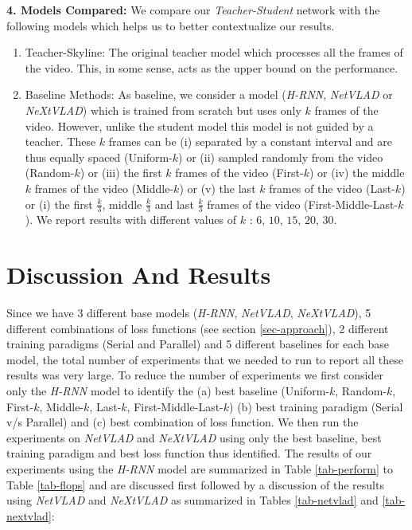 \documentclass[10pt,twocolumn,letterpaper]{article}
\newcommand{\full}{Teacher-Skyline}
\newcommand{\kstart}[1]{First-$#1$}
\newcommand{\kmid}[1]{Middle-$#1$}
\newcommand{\kend}[1]{Last-$#1$}
\newcommand{\sme}[1]{First-Middle-Last-$#1$}
\newcommand{\uni}[1]{Uniform-$#1$}
\newcommand{\rand}[1]{Random-$#1$}
\begin{document}
\noindent \textbf{4. Models Compared:} We compare our \textit{Teacher-Student} network with the following models which helps us to better contextualize our results. \begin{enumerate}[leftmargin=*,label=\alph*)]
\item \full: The original teacher model which processes all the frames of the video. This, in some sense, acts as the upper bound on the performance.
\item Baseline Methods: As baseline, we consider a model (\textit{H-RNN}, \textit{NetVLAD} or \textit{NeXtVLAD}) which is trained from scratch but uses only $k$ frames of the video. However, unlike the student model this model is not guided by a teacher. These $k$ frames can be (i) separated by a constant interval and are thus equally spaced (\uni{k}) or (ii) sampled randomly from the video (\rand{k}) or (iii) the first $k$ frames of the video (\kstart{k}) or (iv) the middle $k$ frames of the video (\kmid{k}) or (v) the last $k$ frames of the video (\kend{k}) or (i) the first $\frac{k}{3}$, middle $\frac{k}{3}$ and last $\frac{k}{3}$ frames of the video (\sme{k}). We report results with different values of $k$ : $6$, $10$, $15$, $20$, $30$.
\end{enumerate}


\section{Discussion And Results} 
Since we have 3 different base models (\textit{H-RNN}, \textit{NetVLAD}, \textit{NeXtVLAD}), 5 different combinations of loss functions (see section \ref{sec-approach}), 2 different training paradigms (Serial and Parallel) and 5 different baselines for each base model, the total number of experiments that we needed to run to report all these results was very large. To reduce the number of experiments we first consider only the \textit{H-RNN} model to identify the (a) best baseline (\uni{k}, \rand{k}, \kstart{k}, \kmid{k}, \kend{k}, \sme{k})  (b) best training paradigm (Serial v/s Parallel) and (c) best combination of loss function. We then run the experiments on \textit{NetVLAD} and \textit{NeXtVLAD} using only the best baseline, best training paradigm and best loss function thus identified. The results of our experiments using the \textit{H-RNN} model are summarized in Table \ref{tab-perform} to Table \ref{tab-flops} and are discussed first followed by a discussion of the results using \textit{NetVLAD} and \textit{NeXtVLAD} as summarized in Tables \ref{tab-netvlad} and \ref{tab-nextvlad}:    
\end{document}
